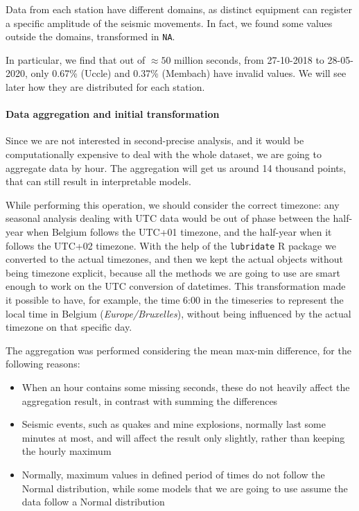 \documentclass[12pt]{article}
\begin{document}
Data from each station have different domains, as distinct equipment can register a specific amplitude of the seismic movements. In fact, we found some values outside the domains, transformed in \texttt{NA}.

In particular, we find that out of $\approx50$ million seconds, from 27-10-2018 to 28-05-2020, only 0.67\% (Uccle) and 0.37\% (Membach) have invalid values. We will see later how they are distributed for each station.



\paragraph{Data aggregation and initial transformation}
Since we are not interested in second-precise analysis, and it would be computationally expensive to deal with the whole dataset, we are going to aggregate data by hour. The aggregation will get us around 14 thousand points, that can still result in interpretable models.

While performing this operation, we should consider the correct timezone: any seasonal analysis dealing with UTC data would be out of phase between the half-year when Belgium follows the UTC+01 timezone, and the half-year when it follows the UTC+02 timezone. With the help of the \texttt{lubridate} R package we converted to the actual timezones, and then we kept the actual objects without being timezone explicit, because all the methods we are going to use are smart enough to work on the UTC conversion of datetimes. This transformation made it possible to have, for example, the time 6:00 in the timeseries to represent the local time in Belgium (\textit{Europe/Bruxelles}), without being influenced by the actual timezone on that specific day.

The aggregation was performed considering the mean max-min difference, for the following reasons:
\begin{itemize}
	\item When an hour contains some missing seconds, these do not heavily affect the aggregation result, in contrast with summing the differences
	\item Seismic events, such as quakes and mine explosions, normally last some minutes at most, and will affect the result only slightly, rather than keeping the hourly maximum
	\item Normally, maximum values in defined period of times do not follow the Normal distribution, while some models that we are going to use assume the data follow a Normal distribution
\end{itemize}
\end{document}
